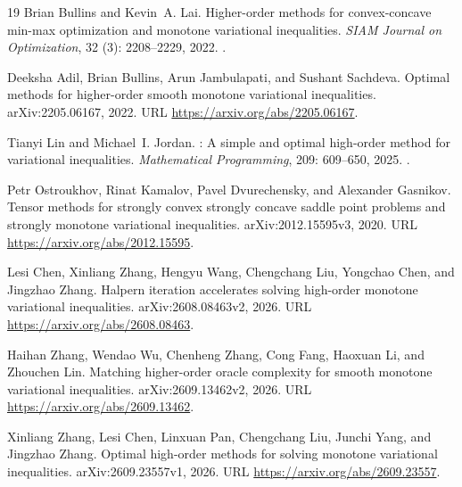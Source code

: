 \documentclass[11pt]{article}
\numberwithin{equation}{section}
\theoremstyle{definition}
\theoremstyle{remark}
\begin{document}
\begin{thebibliography}{19}
Brian Bullins and Kevin~A. Lai.
\newblock Higher-order methods for convex-concave min-max optimization and
  monotone variational inequalities.
\newblock \emph{SIAM Journal on Optimization}, 32 (3):
  2208--2229, 2022.
\newblock {}.

Deeksha Adil, Brian Bullins, Arun Jambulapati, and Sushant Sachdeva.
\newblock Optimal methods for higher-order smooth monotone variational
  inequalities.
\newblock arXiv:2205.06167, 2022.
\newblock URL \url{https://arxiv.org/abs/2205.06167}.

Tianyi Lin and Michael~I. Jordan.
: A simple and optimal high-order method for variational
  inequalities.
\newblock \emph{Mathematical Programming}, 209: 609--650, 2025.
\newblock {}.

Petr Ostroukhov, Rinat Kamalov, Pavel Dvurechensky, and Alexander Gasnikov.
\newblock Tensor methods for strongly convex strongly concave saddle point
  problems and strongly monotone variational inequalities.
\newblock arXiv:2012.15595v3, 2020.
\newblock URL \url{https://arxiv.org/abs/2012.15595}.

Lesi Chen, Xinliang Zhang, Hengyu Wang, Chengchang Liu, Yongchao Chen, and
  Jingzhao Zhang.
\newblock Halpern iteration accelerates solving high-order monotone variational
  inequalities.
\newblock arXiv:2608.08463v2, 2026{}.
\newblock URL \url{https://arxiv.org/abs/2608.08463}.

Haihan Zhang, Wendao Wu, Chenheng Zhang, Cong Fang, Haoxuan Li, and Zhouchen
  Lin.
\newblock Matching higher-order oracle complexity for smooth monotone
  variational inequalities.
\newblock arXiv:2609.13462v2, 2026{}.
\newblock URL \url{https://arxiv.org/abs/2609.13462}.

Xinliang Zhang, Lesi Chen, Linxuan Pan, Chengchang Liu, Junchi Yang, and
  Jingzhao Zhang.
\newblock Optimal high-order methods for solving monotone variational
  inequalities.
\newblock arXiv:2609.23557v1, 2026{}.
\newblock URL \url{https://arxiv.org/abs/2609.23557}.


\end{thebibliography}
\end{document}
